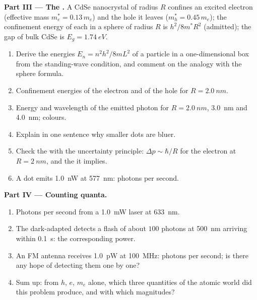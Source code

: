 \begin{problem}
\medskip
\noindent\textbf{Part III --- The .}
A CdSe nanocrystal of radius $R$ confines an excited electron
(effective mass $m_e^\ast = 0.13\,m_e$) and the hole it leaves
($m_h^\ast = 0.45\,m_e$); the confinement energy of each in a sphere of
radius $R$ is $h^2/8m^\ast R^2$ (admitted); the gap of bulk CdSe is
$E_g = \qty{1.74}{eV}$.
\begin{enumerate}[resume]
  \item Derive the energies $E_n = n^2h^2/8mL^2$ of a particle in a
        one-dimensional box from the standing-wave condition, and
        comment on the analogy with the sphere formula.
  \item Confinement energies of the electron and of the hole for
        $R = \qty{2.0}{nm}$.
  \item Energy and wavelength of the emitted photon for $R = \qty{2.0}{nm}$,
        \qty{3.0}{nm} and \qty{4.0}{nm}; colours.
  \item Explain in one sentence why smaller dots are bluer.
  \item Check the  with the uncertainty principle:
        $\Delta p \sim \hbar/R$ for the electron at $R = \qty{2}{nm}$, and the
         it implies.
  \item A dot emits \qty{1.0}{nW} at \qty{577}{nm}: photons per second.
\end{enumerate}

\medskip
\noindent\textbf{Part IV --- Counting quanta.}
\begin{enumerate}[resume]
  \item Photons per second from a \qty{1.0}{mW} laser at \qty{633}{nm}.
  \item The dark-adapted  detects a flash of about $100$ photons at
        \qty{500}{nm} arriving within \qty{0.1}{s}: the corresponding power.
  \item An FM antenna receives \qty{1.0}{pW} at \qty{100}{MHz}: photons per
        second; is there any hope of detecting them one by one?
  \item Sum up: from $h$, $e$, $m_e$ alone, which three quantities of the
        atomic world did this problem produce, and with which
        magnitudes?
\end{enumerate}
\end{problem}
